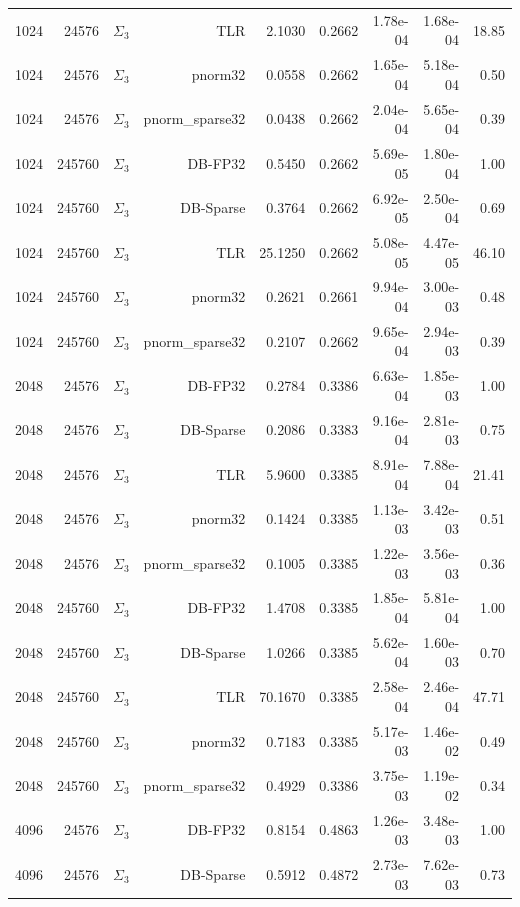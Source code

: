 \begin{tabular}{|r|r|r|r|r|r|r|r|r|}
  1024 & 24576 & $\Sigma_3$ & TLR & 2.1030 & 0.2662 & 1.78e-04 & 1.68e-04 & 18.85 \\
  1024 & 24576 & $\Sigma_3$ & pnorm32 & 0.0558 & 0.2662 & 1.65e-04 & 5.18e-04 & 0.50 \\
  1024 & 24576 & $\Sigma_3$ & pnorm\_sparse32 & 0.0438 & 0.2662 & 2.04e-04 & 5.65e-04 & 0.39 \\
  1024 & 245760 & $\Sigma_3$ & DB-FP32 & 0.5450 & 0.2662 & 5.69e-05 & 1.80e-04 & 1.00 \\
  1024 & 245760 & $\Sigma_3$ & DB-Sparse & 0.3764 & 0.2662 & 6.92e-05 & 2.50e-04 & 0.69 \\
  1024 & 245760 & $\Sigma_3$ & TLR & 25.1250 & 0.2662 & 5.08e-05 & 4.47e-05 & 46.10 \\
  1024 & 245760 & $\Sigma_3$ & pnorm32 & 0.2621 & 0.2661 & 9.94e-04 & 3.00e-03 & 0.48 \\
  1024 & 245760 & $\Sigma_3$ & pnorm\_sparse32 & 0.2107 & 0.2662 & 9.65e-04 & 2.94e-03 & 0.39 \\
  2048 & 24576 & $\Sigma_3$ & DB-FP32 & 0.2784 & 0.3386 & 6.63e-04 & 1.85e-03 & 1.00 \\
  2048 & 24576 & $\Sigma_3$ & DB-Sparse & 0.2086 & 0.3383 & 9.16e-04 & 2.81e-03 & 0.75 \\
  2048 & 24576 & $\Sigma_3$ & TLR & 5.9600 & 0.3385 & 8.91e-04 & 7.88e-04 & 21.41 \\
  2048 & 24576 & $\Sigma_3$ & pnorm32 & 0.1424 & 0.3385 & 1.13e-03 & 3.42e-03 & 0.51 \\
  2048 & 24576 & $\Sigma_3$ & pnorm\_sparse32 & 0.1005 & 0.3385 & 1.22e-03 & 3.56e-03 & 0.36 \\
  2048 & 245760 & $\Sigma_3$ & DB-FP32 & 1.4708 & 0.3385 & 1.85e-04 & 5.81e-04 & 1.00 \\
  2048 & 245760 & $\Sigma_3$ & DB-Sparse & 1.0266 & 0.3385 & 5.62e-04 & 1.60e-03 & 0.70 \\
  2048 & 245760 & $\Sigma_3$ & TLR & 70.1670 & 0.3385 & 2.58e-04 & 2.46e-04 & 47.71 \\
  2048 & 245760 & $\Sigma_3$ & pnorm32 & 0.7183 & 0.3385 & 5.17e-03 & 1.46e-02 & 0.49 \\
  2048 & 245760 & $\Sigma_3$ & pnorm\_sparse32 & 0.4929 & 0.3386 & 3.75e-03 & 1.19e-02 & 0.34 \\
  4096 & 24576 & $\Sigma_3$ & DB-FP32 & 0.8154 & 0.4863 & 1.26e-03 & 3.48e-03 & 1.00 \\
  4096 & 24576 & $\Sigma_3$ & DB-Sparse & 0.5912 & 0.4872 & 2.73e-03 & 7.62e-03 & 0.73 \\

\end{tabular}
